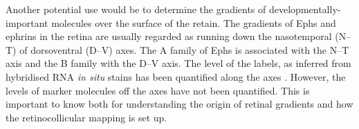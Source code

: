 \documentclass[10pt]{article}
\begin{document}
Another potential use would be to determine the gradients of
developmentally-important molecules over the surface of the retain. The
gradients of Ephs and ephrins in the retina are usually regarded as
running down the nasotemporal (N--T) of dorsoventral (D--V) axes. The
A family of Ephs is associated with the N--T axis and the B family
with the D--V axis. The level of the labels, as inferred from
hybridised RNA \emph{in situ} stains has been quantified along the
axes \cite{ChenEtal95comp,RebeEtal04rela}.  However, the levels of
marker molecules off the axes have not been quantified. This is
important to know both for understanding the origin of retinal
gradients and how the retinocollicular mapping is set up.









\end{document}
